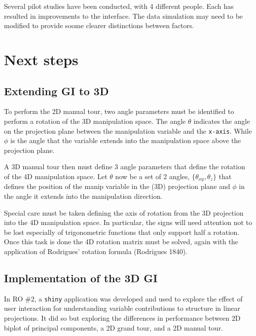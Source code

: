 \documentclass[11,]{article}
\begin{document}
Several pilot studies have been conducted, with 4 different people. Each has resulted in improvements to the interface. The data simulation may need to be modified to provide soome clearer distinctions between factors.

\hypertarget{next-steps}{%
\section{Next steps}\label{next-steps}}

\hypertarget{extending-gi-to-3d}{%
\subsection{Extending GI to 3D}\label{extending-gi-to-3d}}

To perform the 2D manual tour, two angle parameters must be identified to perform a rotation of the 3D manipulation space. The angle \(\theta\) indicates the angle on the projection plane between the manipulation variable and the \texttt{x-axis}. While \(\phi\) is the angle that the variable extends into the manipulation space above the projection plane.

A 3D manual tour then must define 3 angle parameters that define the rotation of the 4D manipulation space. Let \(\theta\) now be a set of 2 angles, \(\{\theta_{xy}, \theta_z\}\) that defines the position of the manip variable in the (3D) projection plane and \(\phi\) in the angle it extends into the manipulation direction.

Special care must be taken defining the axis of rotation from the 3D projection into the 4D manipulation space. In particular, the signs will need attention not to be lost especially of trigonometric functions that only support half a rotation. Once this task is done the 4D rotation matrix must be solved, again with the application of Rodrigues' rotation formula (Rodrigues 1840).

\hypertarget{implementation-of-the-3d-gi}{%
\subsection{Implementation of the 3D GI}\label{implementation-of-the-3d-gi}}

In RO \#2, a \texttt{shiny} application was developed and used to explore the effect of user interaction for understanding variable contributions to structure in linear projections. It did so but exploring the differences in performance between 2D biplot of principal components, a 2D grand tour, and a 2D manual tour.
\end{document}
